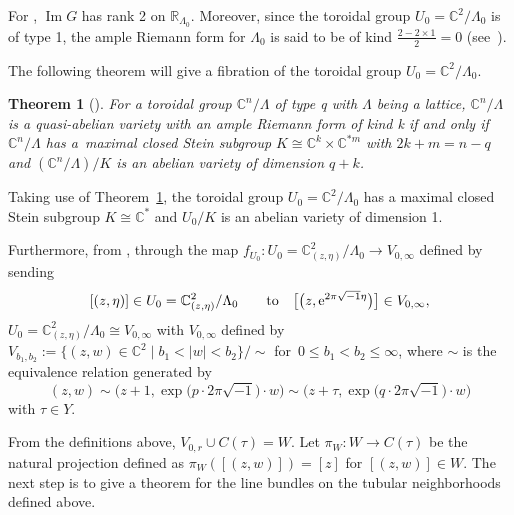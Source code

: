 \documentclass[pdftex]{sigma}
\numberwithin{equation}{section}
\newtheorem{Theorem}{Theorem}[section]
\begin{document}
For , $\operatorname{\operatorname{Im}}G$ has rank 2 on $\mathbb{R}_{\Lambda_0}$. Moreover, since the toroidal group $U_0=\mathbb{C}^2/\Lambda_0$ is of type 1, the ample Riemann form  for $\Lambda_0$ is said to be of kind $\frac{2-2\times1}{2}=0$ (see~\cite[Definition~3.1.12]{Yukitaka-Klaus}).

The following theorem will give a fibration of the toroidal group $U_0=\mathbb{C}^2/\Lambda_0$.

\begin{Theorem}[{\cite[Theorem~3.1.16]{Yukitaka-Klaus}}]\label{Theorem2.18}
 For a toroidal group $\mathbb{C}^n/\Lambda$ of type q with $\Lambda$ being a lattice, $\mathbb{C}^n/\Lambda$ is a quasi-abelian variety with an ample Riemann form of kind k if and only if $\mathbb{C}^n/\Lambda$ has a~maximal closed Stein subgroup $K \cong \mathbb{C}^k\times \mathbb{C}^{*m}$ with $2k+m=n-q$ and $(\mathbb{C}^n/\Lambda)/K$ is an abelian variety of dimension $q+k$.
\end{Theorem}

Taking use of Theorem~\ref{Theorem2.18}, the toroidal group $U_0=\mathbb{C}^2/\Lambda_0$ has a maximal closed Stein subgroup $K \cong \mathbb{C}^*$ and $U_0/K$ is an abelian variety of dimension 1.

Furthermore, from \cite{Takayuki-Takato2}, through the map $f_{U_0}\colon U_0=\mathbb{C}^2_{(z,\eta)}/{\Lambda_0}\rightarrow V_{0,\infty}$ defined by sending
\[
[(z,\eta)]\in U_0=\mathbb{C}^2_{(z,\eta)}/{\Lambda_0} \qquad \text{to} \quad \big[\bigl(z,{\rm e}^{2\pi \sqrt{-1}\eta}\bigr)\big]\in V_{0,\infty},
\]
$U_0=\mathbb{C}^2_{(z,\eta)}/{\Lambda_0}\cong V_{0,\infty}$ with $V_{0,\infty}$ defined by
$V_{b_1,b_2}:=\big \{ (z,w)\in \mathbb{C}^2\mid b_1<|w|<b_2 \big \}/{\sim}$
for~${0\leq b_1<b_2\leq\infty}$, where $\sim$ is the equivalence relation generated by
\[(z,w)\sim\big(z+1,\exp\big(p\cdot 2\pi \sqrt{-1}\big)\cdot w)\sim\big(z+\tau,\exp\big(q\cdot 2\pi \sqrt{-1}\big)\cdot w\big)\]
with $\tau \in Y$.

From the definitions above, $V_{0,r}\cup C(\tau)=W$. Let $\pi_W\colon W \rightarrow C(\tau)$ be the natural projection defined as $\pi_W([(z,w)])=[z]$ for $[(z,w)]\in W$. The next step is to give a theorem for the line bundles on the tubular neighborhoods defined above.
\end{document}
